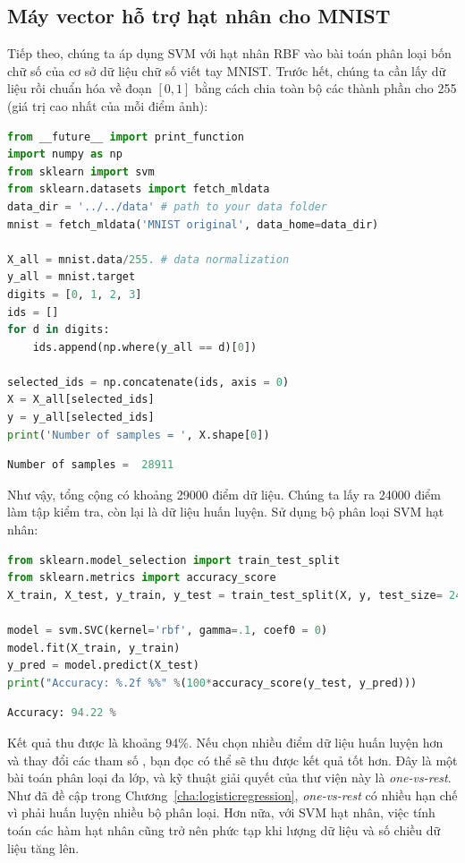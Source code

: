  
\subsection{Máy vector hỗ trợ hạt nhân cho MNIST}
Tiếp theo, chúng ta áp dụng SVM với hạt nhân RBF vào bài toán phân loại bốn chữ số  của cơ sở dữ liệu chữ số viết tay MNIST.
Trước hết, chúng ta cần lấy dữ liệu rồi chuẩn hóa về đoạn $[0, 1]$ bằng cách chia toàn bộ các thành phần cho 255 (giá trị cao
nhất của mỗi điểm ảnh): 
\begin{lstlisting}[language=Python]
from __future__ import print_function 
import numpy as np 
from sklearn import svm
from sklearn.datasets import fetch_mldata
data_dir = '../../data' # path to your data folder 
mnist = fetch_mldata('MNIST original', data_home=data_dir)

X_all = mnist.data/255. # data normalization 
y_all = mnist.target 
digits = [0, 1, 2, 3]
ids = []
for d in digits:
    ids.append(np.where(y_all == d)[0])

selected_ids = np.concatenate(ids, axis = 0)
X = X_all[selected_ids]
y = y_all[selected_ids]
print('Number of samples = ', X.shape[0])
\end{lstlisting}
\kq 
\begin{lstlisting}[language=Python]
Number of samples =  28911
\end{lstlisting}
Như vậy, tổng cộng có khoảng 29000 điểm dữ liệu. Chúng ta lấy ra 24000
điểm làm tập kiểm tra, còn lại là dữ liệu huấn luyện. Sử dụng bộ phân loại SVM hạt nhân:
\begin{lstlisting}[language=Python]
from sklearn.model_selection import train_test_split
from sklearn.metrics import accuracy_score
X_train, X_test, y_train, y_test = train_test_split(X, y, test_size= 24000)

model = svm.SVC(kernel='rbf', gamma=.1, coef0 = 0)
model.fit(X_train, y_train)
y_pred = model.predict(X_test) 
print("Accuracy: %.2f %%" %(100*accuracy_score(y_test, y_pred))) 
\end{lstlisting}
\kq 
\begin{lstlisting}[language=Python]
Accuracy: 94.22 %
\end{lstlisting}
Kết quả thu được là khoảng 94\%. Nếu chọn nhiều điểm dữ liệu huấn luyện hơn và
thay đổi các tham số , bạn đọc có thể sẽ thu được
kết quả tốt hơn. Đây là một bài toán phân loại đa lớp, và
kỹ thuật giải quyết của thư viện này là \textit{one-vs-rest}. Như đã đề cập trong
Chương~\ref{cha:logisticregression}, \textit{one-vs-rest} có nhiều hạn chế vì
phải huấn luyện nhiều bộ phân loại. Hơn nữa, với SVM hạt nhân, việc tính toán các
hàm hạt nhân cũng trở nên phức tạp khi lượng dữ liệu và số chiều dữ liệu tăng lên.


